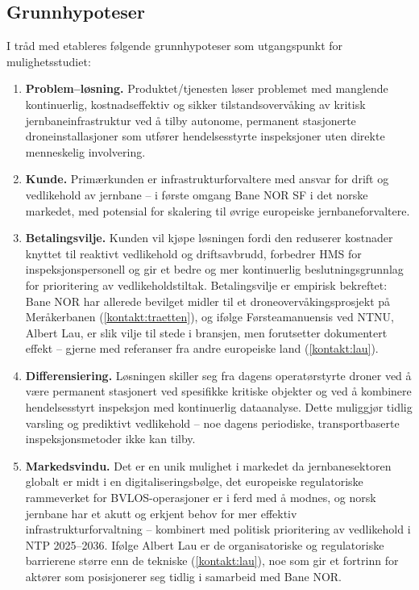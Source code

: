 \subsection{Grunnhypoteser}

I tråd med \textcite{torvatn_teknologiledelse_2024} etableres følgende
grunnhypoteser som utgangspunkt for mulighetsstudiet:

\begin{enumerate}
    \item \textbf{Problem--løsning.} Produktet/tjenesten løser problemet med manglende kontinuerlig, kostnadseffektiv og sikker tilstandsovervåking av kritisk jernbaneinfrastruktur ved å tilby autonome, permanent stasjonerte droneinstallasjoner som utfører hendelsesstyrte inspeksjoner uten direkte menneskelig involvering.

    \item \textbf{Kunde.} Primærkunden er infrastrukturforvaltere med ansvar for drift og vedlikehold av jernbane -- i første omgang Bane NOR SF i det norske markedet, med potensial for skalering til øvrige europeiske jernbaneforvaltere.

    \item \textbf{Betalingsvilje.} Kunden vil kjøpe løsningen fordi den reduserer kostnader knyttet til reaktivt vedlikehold og driftsavbrudd, forbedrer HMS for inspeksjonspersonell og gir et bedre og mer kontinuerlig beslutningsgrunnlag for prioritering av vedlikeholdstiltak. Betalingsvilje er empirisk bekreftet: Bane NOR har allerede bevilget midler til et droneovervåkingsprosjekt på Meråkerbanen (\cref{kontakt:traetten}), og ifølge Førsteamanuensis ved NTNU, Albert Lau, er slik vilje til stede i bransjen, men forutsetter dokumentert effekt -- gjerne med referanser fra andre europeiske land (\cref{kontakt:lau}).

    \item \textbf{Differensiering.} Løsningen skiller seg fra dagens operatørstyrte droner ved å være permanent stasjonert ved spesifikke kritiske objekter og ved å kombinere hendelsesstyrt inspeksjon med kontinuerlig dataanalyse. Dette muliggjør tidlig varsling og prediktivt vedlikehold -- noe dagens periodiske, transportbaserte inspeksjonsmetoder ikke kan tilby.

    \item \textbf{Markedsvindu.} Det er en unik mulighet i markedet da jernbanesektoren globalt er midt i en digitaliseringsbølge, det europeiske regulatoriske rammeverket for BVLOS-operasjoner er i ferd med å modnes, og norsk jernbane har et akutt og erkjent behov for mer effektiv infrastrukturforvaltning -- kombinert med politisk prioritering av vedlikehold i NTP 2025--2036. Ifølge Albert Lau er de organisatoriske og regulatoriske barrierene større enn de tekniske (\cref{kontakt:lau}), noe som gir et fortrinn for aktører som posisjonerer seg tidlig i samarbeid med Bane NOR.
\end{enumerate}

